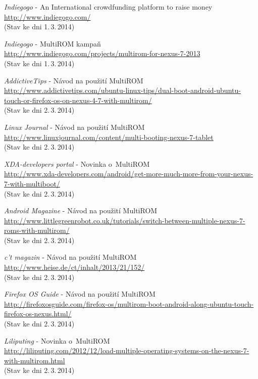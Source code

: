 \documentclass[12pt, a4paper, oneside]{article}
\newcommand{\It}{\textit}  %
\begin{document}
\begin{thebibliography}{99}
     \It{Indiegogo} - An International crowdfunding platform to raise money\\
    \url{http://www.indiegogo.com/}\\
    (Stav ke dni 1.\,3.\,2014)

     \It{Indiegogo} - MultiROM kampaň\\
    \url{http://www.indiegogo.com/projects/multirom-for-nexus-7-2013}\\
    (Stav ke dni 1.\,3.\,2014)

     \It{AddictiveTips} - Návod na použití MultiROM\\
    \url{http://www.addictivetips.com/ubuntu-linux-tips/dual-boot-android-ubuntu-touch-or-firefox-os-on-nexus-4-7-with-multirom/}\\
    (Stav ke dni 2.\,3.\,2014)

     \It{Linux Journal} - Návod na použití MultiROM\\
    \url{http://www.linuxjournal.com/content/multi-booting-nexus-7-tablet}\\
    (Stav ke dni 2.\,3.\,2014)

     \It{XDA-developers portal} - Novinka o~MultiROM\\
    \url{http://www.xda-developers.com/android/get-more-much-more-from-your-nexus-7-with-multiboot/}\\
    (Stav ke dni 2.\,3.\,2014)

     \It{Android Magazine} - Návod na použití MultiROM\\
    \url{http://www.littlegreenrobot.co.uk/tutorials/switch-between-multiple-nexus-7-roms-with-multirom/}\\
    (Stav ke dni 2.\,3.\,2014)

     \It{c't magazin} - Návod na použití MultiROM\\
    \url{http://www.heise.de/ct/inhalt/2013/21/152/}\\
    (Stav ke dni 2.\,3.\,2014)

     \It{Firefox OS Guide} - Návod na použití MultiROM\\
    \url{http://firefoxosguide.com/firefox-os/multirom-boot-android-along-ubuntu-touch-firefox-os-nexus.html/}\\
    (Stav ke dni 2.\,3.\,2014)

     \It{Liliputing} - Novinka o~MultiROM\\
    \url{http://liliputing.com/2012/12/load-multiple-operating-systems-on-the-nexus-7-with-multirom.html}\\
    (Stav ke dni 2.\,3.\,2014)


\end{thebibliography}
\end{document}
